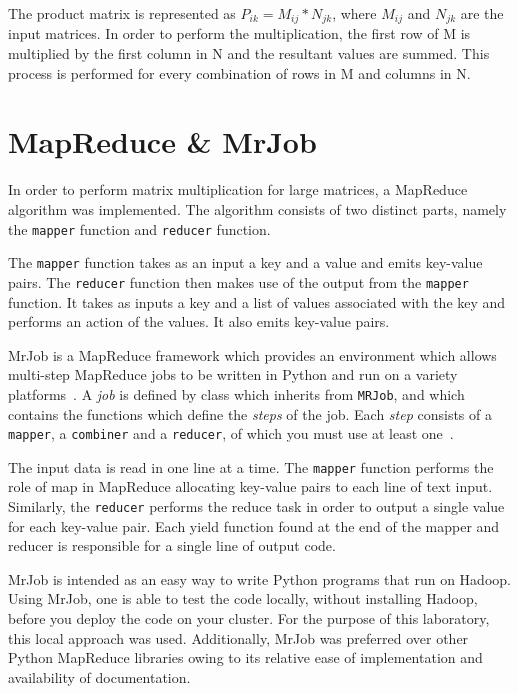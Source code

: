 \documentclass[10pt,twocolumn]{witseiepaper}
\begin{document}
The product matrix is represented as $P_{ik} = M_{ij} * N_{jk}$, where $M_{ij}$ and $N_{jk}$ are the input matrices. In order to perform the multiplication, the first row of M is multiplied by the first column in N and the resultant values are summed. This process is performed for every combination of rows in M and columns in N. 

\section{MapReduce \& MrJob}

In order to perform matrix multiplication for large matrices, a MapReduce algorithm was implemented. The algorithm consists of two distinct parts, namely the \texttt{mapper} function and \texttt{reducer} function. 

The \texttt{mapper} function takes as an input a key and a value and emits key-value pairs. The \texttt{reducer} function then makes use of the output from the \texttt{mapper} function. It takes as inputs a key and a list of values associated with the key and performs an action of the values. It also emits key-value pairs.

MrJob is a MapReduce framework which provides an environment which allows multi-step MapReduce jobs to be written in Python and run on a variety platforms~\cite{mrjob}. A \textit{job} is defined by class which inherits from \texttt{MRJob}, and which contains the functions which define the \textit{steps} of the job. Each \textit{step} consists of a \texttt{mapper}, a \texttt{combiner} and a \texttt{reducer}, of which you must use at least one~\cite{mrjob}.

The input data is read in one line at a time. The \texttt{mapper} function performs the role of map in MapReduce allocating key-value pairs to each line of text input. Similarly, the \texttt{reducer} performs the reduce task in order to output a single value for each key-value pair. Each yield function found at the end of the mapper and reducer is responsible for a single line of output code.

MrJob is intended as an easy way to write Python programs that run on Hadoop. Using MrJob, one is able to test the code locally, without installing Hadoop, before you deploy the code on your cluster. For the purpose of this laboratory, this local approach was used. Additionally, MrJob was preferred over other Python MapReduce libraries owing to its relative ease of implementation and availability of documentation.
\end{document}
